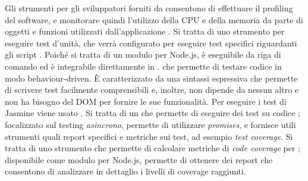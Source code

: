 Gli strumenti per gli sviluppatori forniti da  consentono di effettuare il profiling del software, e monitorare quindi l'utilizzo della CPU e della memoria da parte di oggetti e funzioni  utilizzati dall'applicazione .
Si tratta di uno strumento per eseguire test d'unità, che verrà configurato per eseguire test specifici riguardanti gli script . Poiché si tratta di un modulo per Node.js, è eseguibile da riga di comando ed è integrabile direttamente in \textbf{}.
 che permette di testare codice  in modo behaviour-driven. \`{E} caratterizzato da una sintassi espressiva che permette di scrivere test facilmente comprensibili e, inoltre, non dipende da nessun altro  e non ha bisogno del DOM per fornire le sue funzionalità. Per eseguire i test di Jasmine viene usato .
Si tratta di un  che permette di eseguire dei test su codice ; focalizzato sul testing \textit{asincrono}, permette di utilizzare \textit{promises}, e fornisce utili strumenti quali report specifici e metriche sui test, ad esempio \textit{test coverage}.
Si tratta di uno strumento che permette di calcolare metriche di \textit{code coverage} per ; disponibile come modulo per Node.js, permette di ottenere dei report  che consentono di analizzare in dettaglio i livelli di coverage raggiunti.

